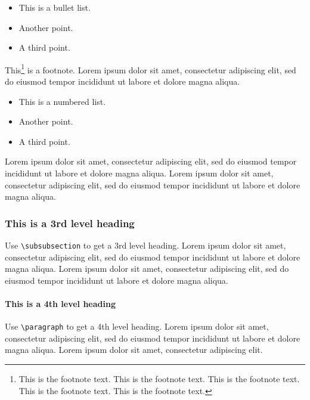 \documentclass[a4paper,num-refs,gigabyte]{oup-contemporary}
\begin{document}
\begin{itemize}
\item This is a bullet list.
\item Another point.
\item A third point.
\end{itemize}

This\footnote{This is the footnote text. This is the footnote text. This is the footnote text. This is the footnote text. This is the footnote text.} is a footnote. Lorem ipsum dolor sit amet, consectetur adipiscing elit, sed do eiusmod tempor incididunt ut labore et dolore magna aliqua.

\begin{itemize}
\item This is a numbered list.
\item Another point.
\item A third point.
\end{itemize}

Lorem ipsum dolor sit amet, consectetur adipiscing elit, sed do eiusmod tempor incididunt ut labore et dolore magna aliqua. Lorem ipsum dolor sit amet, consectetur adipiscing elit, sed do eiusmod tempor incididunt ut labore et dolore magna aliqua.


\subsubsection{This is a 3rd level heading}

Use \verb|\subsubsection| to get a 3rd level heading.
Lorem ipsum dolor sit amet, consectetur adipiscing elit, sed do eiusmod tempor incididunt ut labore et dolore magna aliqua. Lorem ipsum dolor sit amet, consectetur adipiscing elit, sed do eiusmod tempor incididunt ut labore et dolore magna aliqua. 


\paragraph{This is a 4th level heading}

Use \verb|\paragraph| to get a 4th level heading.
Lorem ipsum dolor sit amet, consectetur adipiscing elit, sed do eiusmod tempor incididunt ut labore et dolore magna aliqua. Lorem ipsum dolor sit amet, consectetur adipiscing elit. 
\end{document}
